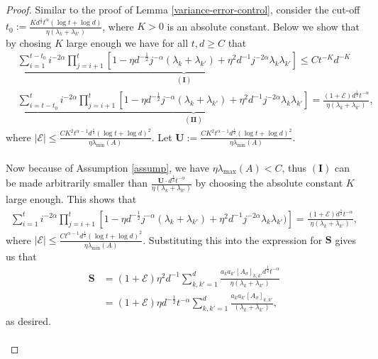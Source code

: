 \documentclass[11pt, reqno,english]{amsart}
\begin{document}
\begin{proof}
Similar to the proof of Lemma \ref{variance-error-control}, consider the cut-off $t_0 := \frac{Kd^{\frac{1}{2}}t^{\alpha} (\log t + \log d)}{\eta (\lambda_k + \lambda_{k'})}$, where $K > 0$ is an absolute constant. Below we show that by chosing $K$ large enough we have for all $t,d \geq C$ that
\begin{align*}
    &\underbrace{\sum_{i = 1}^{t-t_0} i^{-2\alpha}\prod_{j=i+1}^t[1 - \eta d^{-\frac{1}{2}} j^{-\alpha} (\lambda_k + \lambda_{k'}) + \eta^2 d^{-1} j^{-2\alpha} \lambda_{k} \lambda_{k'}] \leq Ct^{-K}d^{-K}}_{(\mathbf{I})}
    \\
    &\underbrace{\sum_{i = t-t_0}^{t} i^{-2\alpha}\prod_{j=i+1}^t[1 - \eta d^{-\frac{1}{2}} j^{-\alpha} (\lambda_k + \lambda_{k'}) + \eta^2 d^{-1} j^{-2\alpha} \lambda_{k} \lambda_{k'}] = \frac{(1 + \mathcal E)d^{\frac{1}{2}}t^{-\alpha}}{\eta (\lambda_k + \lambda_{k'})}}_{(\mathbf{II})},
\end{align*}
where $|\mathcal E| \leq \frac{CK^2 t^{\alpha - 1}d^{\frac{1}{2}}(\log t + \log d)^2}{\eta \lambda_{\min}(A)}$.  Let $\mathbf{U} := \frac{CK^2 t^{\alpha - 1}d^{\frac{1}{2}}(\log t + \log d)^2}{\eta \lambda_{\min}(A)}$.
\\\\
Now because of Assumption \ref{assump}, we have $\eta \lambda_{\max}(A) <  C$, thus $(\mathbf{I})$ can be made arbitrarily smaller than $\frac{\mathbf{U}\cdot d^{\frac{1}{2}}t^{-\alpha}}{\eta (\lambda_k + \lambda_{k'})}$ by choosing the absolute constant $K$ large enough. This shows that
\begin{align*}
\sum_{i = 1}^t i^{-2\alpha} \prod_{j = i+1}^t [1 - \eta d^{-\frac{1}{2}}j^{-\alpha}(\lambda_k + \lambda_{k'}) + \eta^2 d^{-1} j^{-2\alpha} \lambda_k \lambda_{k'})] = \frac{(1 + \mathcal E)d^{\frac{1}{2}}t^{-\alpha}}{\eta (\lambda_k + \lambda_{k'})},
\end{align*}
where $|\mathcal E| \leq \frac{Ct^{\alpha - 1}d^{\frac{1}{2}}(\log t + \log d)^2}{\eta \lambda_{\min}(A)}$. Substituting this into the expression for $\mathbf{S}$ gives us that
\begin{align*}
\mathbf{S} &= (1 + \mathcal E)\eta^2 d^{-1} \sum_{k,k' = 1}^d \frac{a_k a_{k'} [A_{\sigma}]_{k,k'}d^{\frac{1}{2}}t^{-\alpha}}{\eta (\lambda_k + \lambda_{k'})}
\\
&= (1 + \mathcal E)\eta d^{-\frac{1}{2}}t^{-\alpha}\sum_{k,k' = 1}^d \frac{a_{k}a_{k'}[A_{\sigma}]_{k,k'}}{(\lambda_k + \lambda_{k'})},
\end{align*}
as desired.
\\\\

\end{proof}
\end{document}
